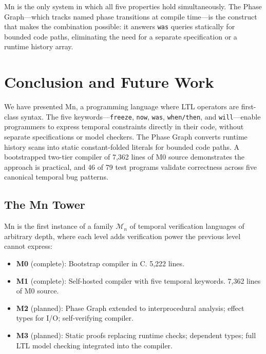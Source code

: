 \documentclass[11pt,a4paper]{article}
\begin{document}
Mn is the only system in which all five properties hold simultaneously. The Phase
Graph---which tracks named phase transitions at compile time---is the construct that makes the
combination possible: it answers \texttt{was} queries statically for bounded code paths,
eliminating the need for a separate specification or a runtime history array.

\section{Conclusion and Future Work}

We have presented Mn, a programming language where LTL operators are first-class syntax. The
five keywords---\texttt{freeze}, \texttt{now}, \texttt{was}, \texttt{when/then}, and
\texttt{will}---enable programmers to express temporal constraints directly in their code,
without separate specifications or model checkers. The Phase Graph converts runtime history
scans into static constant-folded literals for bounded code paths. A bootstrapped two-tier
compiler of 7,362 lines of M0 source demonstrates the approach is practical, and 46 of 79 test
programs validate correctness across five canonical temporal bug patterns.

\subsection{The Mn Tower}

Mn is the first instance of a family $\mathcal{M}_n$ of temporal verification languages of
arbitrary depth, where each level adds verification power the previous level cannot express:

\begin{itemize}[leftmargin=*,itemsep=2pt]
  \item \textbf{M0} (complete): Bootstrap compiler in C. 5,222 lines.
  \item \textbf{M1} (complete): Self-hosted compiler with five temporal keywords. 7,362 lines
    of M0 source.
  \item \textbf{M2} (planned): Phase Graph extended to interprocedural analysis; effect types
    for I/O; self-verifying compiler.
  \item \textbf{M3} (planned): Static proofs replacing runtime checks; dependent types; full
    LTL model checking integrated into the compiler.
\end{itemize}
\end{document}

